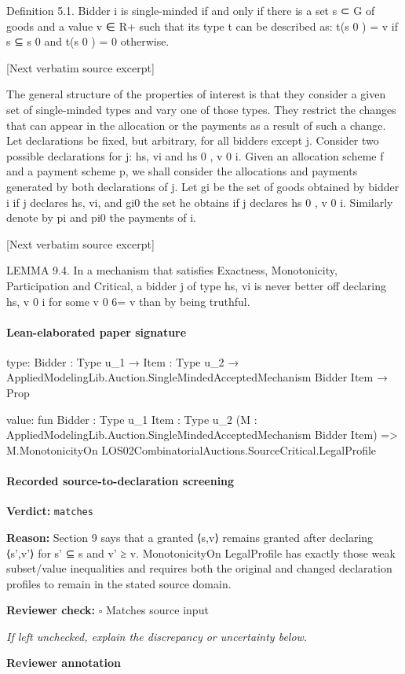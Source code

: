 \documentclass[10pt]{article}
\newcommand{\reviewerbox}{%
  \par\noindent\fbox{\parbox{0.96\linewidth}{\rule{0pt}{0.38in}}}\par
}
\newcommand{\reviewmatch}[1]{%
  \par\noindent\textbf{Reviewer check:} $\square$\; #1\par
  \noindent\emph{If left unchecked, explain the discrepancy or uncertainty below.}\par
}
\begin{document}
\begin{ReviewVerbatim}

Definition 5.1. Bidder i is single-minded if and only if there is a set s ⊂ G of
goods and a value v ∈ R+ such that its type t can be described as: t(s 0 ) = v if s ⊆ s 0
and t(s 0 ) = 0 otherwise.

[Next verbatim source excerpt]

The general structure of the properties of interest is that they consider a given
set of single-minded types and vary one of those types. They restrict the changes
that can appear in the allocation or the payments as a result of such a change.
Let declarations be fixed, but arbitrary, for all bidders except j. Consider two
possible declarations for j: hs, vi and hs 0 , v 0 i. Given an allocation scheme f and a
payment scheme p, we shall consider the allocations and payments generated by
both declarations of j. Let gi be the set of goods obtained by bidder i if j declares
hs, vi, and gi0 the set he obtains if j declares hs 0 , v 0 i. Similarly denote by pi and pi0
the payments of i.

[Next verbatim source excerpt]

LEMMA 9.4. In a mechanism that satisfies Exactness, Monotonicity, Participation and Critical, a bidder j of type hs, vi is never better off declaring hs, v 0 i for
some v 0 6= v than by being truthful.
\end{ReviewVerbatim}



\paragraph{Lean-elaborated paper signature}
\begin{ReviewVerbatim}
type:
{Bidder : Type u_1} → {Item : Type u_2} → AppliedModelingLib.Auction.SingleMindedAcceptedMechanism Bidder Item → Prop

value:
fun {Bidder : Type u_1} {Item : Type u_2} (M : AppliedModelingLib.Auction.SingleMindedAcceptedMechanism Bidder Item) =>
  M.MonotonicityOn LOS02CombinatorialAuctions.SourceCritical.LegalProfile
\end{ReviewVerbatim}


\paragraph{Recorded source-to-declaration screening}
\textbf{Verdict:} \texttt{matches}
\\
{\raggedright
\textbf{Reason:} Section 9 says that a granted ⟨s,v⟩ remains granted after declaring ⟨s',v'⟩ for s' ⊆ s and v' ≥ v.\allowbreak{} MonotonicityOn LegalProfile has exactly those weak subset/\allowbreak{}value inequalities and requires both the original and changed declaration profiles to remain in the stated source domain.\allowbreak{}
\par}
\reviewmatch{Matches source input}
\noindent\textbf{Reviewer annotation}\par
\reviewerbox
\clearpage
\hypertarget{paper-prerequisite-308c55c442d0f9c2}{}
\end{document}
